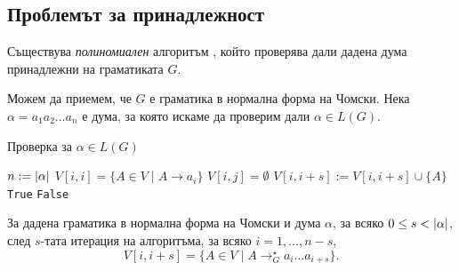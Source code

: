 \subsection{Проблемът за принадлежност}

\begin{thm}
  Съществува {\em полиномиален} алгоритъм , който проверява дали дадена дума принадлежни на граматиката $G$.
\end{thm}
Можем да приемем, че $G$ е граматика в нормална форма на Чомски.
Нека $\alpha = a_1a_2\dots a_n$ е дума, за която искаме да проверим дали $\alpha \in L(G)$.
\begin{algorithm}[H]
  \caption{Проверка за $\alpha \in L(G)$}
  \label{alg:belongs-to-grammar}
  \begin{algorithmic}[1]
    \State $n := \lvert{\alpha}\rvert$
    \State $V[i,i] = \{A \in V \mid A\rightarrow a_i\}$
    \EndFor
    \State$V[i,j] = \emptyset$
    \EndFor      
    \ForAll{$s \in [1, n)$} 
    \ForAll{$k \in [i, i + s)$}
    \State $V[i,i+s] := V[i,i+s] \cup \{A\}$
    \EndIf
    \EndFor
    \EndFor
    \EndFor
    \State \Return \texttt{True}
    \Else
    \State \Return \texttt{False}
    \EndIf
  \end{algorithmic}
\end{algorithm}

\begin{lemma}
  За дадена граматика в нормална форма на Чомски и дума $\alpha$, 
  за всяко $0 \leq s < \lvert{\alpha}\rvert$, след $s$-тата итерация на алгоритъма, за всяко $i = 1,\dots,n-s$,
  \[V[i,i+s] = \{A \in V \mid A \rightarrow^\star_G a_i\dots a_{i+s}\}.\]
\end{lemma}

  
